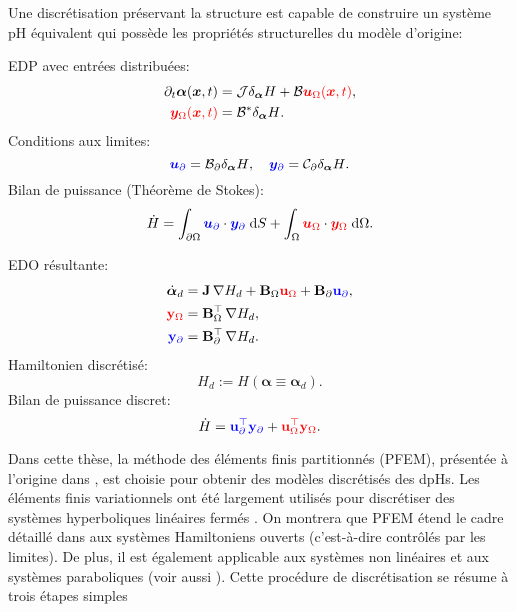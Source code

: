 Une discrétisation préservant la structure est capable de construire un système pH équivalent qui possède les propriétés structurelles du modèle d'origine:
\begin{tcbraster}[raster columns=2, raster equal height]
	\begin{tcolorbox}[width=0.4\textwidth, nobeforeafter, colframe=theme,title=Système pH de dimension infinie]%
		EDP avec entrées distribuées:
		\begin{align*}
		\partial_t {\bm{\alpha}}(\bm{x}, t) &= \mathcal{J} {\displaystyle \delta_{\bm{\alpha}} {H}}+ \mathcal{B} \textcolor{red}{\bm{u}_\Omega(\bm{x}, t)}, \\
		\textcolor{red}{\bm{y}_\Omega(\bm{x}, t)} &= \mathcal{B}^* {\displaystyle  \delta_{\bm{\alpha}} {H}}.
		\end{align*}
		Conditions aux limites: 
		\[\textcolor{blue}{\bm{u}_\partial} = \mathcal{B}_\partial{\displaystyle  \delta_{\bm{\alpha}} {H}}, \quad \textcolor{blue}{\bm{y}_\partial} = \mathcal{C}_\partial {\displaystyle  \delta_{\bm{\alpha}} {H}}. \]
		Bilan de puissance (Théorème de Stokes): 
		\[ \dot{H} = \displaystyle \int_{\partial \Omega} \textcolor{blue}{\bm{u}_\partial} \cdot \textcolor{blue}{\bm{y}_\partial} \d{S} +  \int_{\Omega} \textcolor{red}{\bm{u}_\Omega} \cdot \textcolor{red}{\bm{y}_\Omega} \d{\Omega}.
		\]
	\end{tcolorbox} 
	\begin{tcolorbox}[width=0.4\textwidth, nobeforeafter,  colframe=theme,title=Discretisation préservant la structure]%
		EDO résultante:
		\begin{align*}
		\dot{\bm{\alpha}}_d &= \mathbf{J} \, {\nabla {H}_d} + \mathbf{B}_\Omega \textcolor{red}{\mathbf{u}_\Omega} + \mathbf{B}_\partial \textcolor{blue}{\mathbf{u}_\partial}, \\
		\textcolor{red}{\mathbf{y}_\Omega} &= \mathbf{B}_\Omega^\top \, {\nabla {H}_d}, \\
		\textcolor{blue}{\mathbf{y}_\partial} &= \mathbf{B}_\partial^\top \,{\nabla {H}_d}.
		\end{align*}
		Hamiltonien discrétisé:
		\[
		H_d := H(\bm{\alpha} \equiv \bm{\alpha}_d).
		\]
		Bilan de puissance discret: 
		\[ \dot{H} = \textcolor{blue}{\mathbf{u}_\partial^\top \mathbf{y}_\partial} +  \textcolor{red}{\mathbf{u}_\Omega^\top \mathbf{y}_\Omega}.
		\]
	\end{tcolorbox}
\end{tcbraster}
\vspace{.5cm}
Dans cette thèse, la méthode des éléments finis partitionnés (PFEM), présentée à l'origine dans \cite{cardoso2018pfem,cardoso2019partitioned}, est choisie pour obtenir des modèles discrétisés des dpHs. Les éléments finis variationnels ont été largement utilisés pour discrétiser des systèmes hyperboliques linéaires fermés \cite{joly2003variational}. On montrera que PFEM étend le cadre détaillé dans \cite{joly2003variational} aux systèmes Hamiltoniens ouverts (c'est-à-dire contrôlés par les limites). De plus, il est également applicable aux systèmes non linéaires  et aux systèmes paraboliques  (voir aussi \cite{serhani2019modeling,serhani2019discretization}). Cette procédure de discrétisation se résume à trois étapes simples
